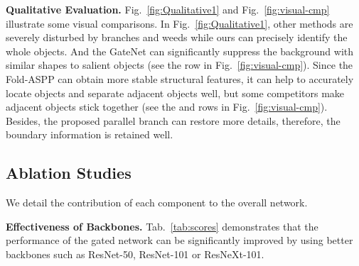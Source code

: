 \documentclass[runningheads]{llncs}
\begin{document}
	\textbf{Qualitative Evaluation.}
	Fig.~\ref{fig:Qualitative1} and Fig.~\ref{fig:visual-cmp} illustrate some visual comparisons. In Fig.~\ref{fig:Qualitative1}, 
other methods are severely disturbed by branches and weeds while ours can precisely identify the whole objects. And the GateNet can significantly suppress the background with similar shapes to salient objects (see the  row in Fig.~\ref{fig:visual-cmp}). Since the Fold-ASPP can obtain more stable structural features, it can help to accurately locate objects and separate adjacent objects well, but some competitors make adjacent objects stick together (see the  and  rows in Fig.~\ref{fig:visual-cmp}). Besides,  the proposed parallel branch can restore more details, therefore, the boundary information is retained well.
	
	\subsection{Ablation Studies}
	We detail the contribution of each component to the overall network.
	
	\textbf{Effectiveness of Backbones.} Tab.~\ref{tab:scores} demonstrates that the performance of the gated network can be significantly improved by using better backbones such as ResNet-50, ResNet-101 or ResNeXt-101.
	
\end{document}
